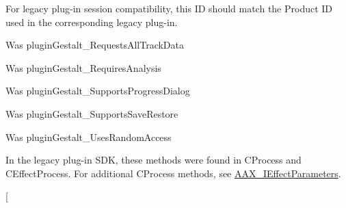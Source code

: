 \begin{DoxyRefList}
\item[\label{a00385__porting_notes000042}%
\hypertarget{a00385__porting_notes000042}{}%
global\+Scope$>$ Member \hyperlink{a00283_a6571f4e41a5dd06e4067249228e2249ea3a41fcdff5af1a4fd19dcbca7b1ba6f3}{A\+A\+X\+\_\+e\+Property\+\_\+\+Product\+I\+D} ]For legacy plug-\/in session compatibility, this I\+D should match the Product I\+D used in the corresponding legacy plug-\/in.  
\item[\label{a00385__porting_notes000052}%
\hypertarget{a00385__porting_notes000052}{}%
global\+Scope$>$ Member \hyperlink{a00283_a6571f4e41a5dd06e4067249228e2249eaa59caaf3d7c3e195a32b8cb09a9baac2}{A\+A\+X\+\_\+e\+Property\+\_\+\+Requests\+All\+Track\+Data} ]Was plugin\+Gestalt\+\_\+\+Requests\+All\+Track\+Data  
\item[\label{a00385__porting_notes000048}%
\hypertarget{a00385__porting_notes000048}{}%
global\+Scope$>$ Member \hyperlink{a00283_a6571f4e41a5dd06e4067249228e2249ea925c49bb79454b33bf1d5f4cb09d373f}{A\+A\+X\+\_\+e\+Property\+\_\+\+Requires\+Analysis} ]Was plugin\+Gestalt\+\_\+\+Requires\+Analysis  
\item[\label{a00385__porting_notes000056}%
\hypertarget{a00385__porting_notes000056}{}%
global\+Scope$>$ Member \hyperlink{a00283_a6571f4e41a5dd06e4067249228e2249eab9a9782ae1aed57b2f2cd6acd1081b38}{A\+A\+X\+\_\+e\+Property\+\_\+\+Supports\+Progress\+Dialog} ]Was plugin\+Gestalt\+\_\+\+Supports\+Progress\+Dialog  
\item[\label{a00385__porting_notes000059}%
\hypertarget{a00385__porting_notes000059}{}%
global\+Scope$>$ Member \hyperlink{a00283_a6571f4e41a5dd06e4067249228e2249ea6d42a3a901f36b74e7b9b8a84d4d5298}{A\+A\+X\+\_\+e\+Property\+\_\+\+Supports\+Save\+Restore} ]Was plugin\+Gestalt\+\_\+\+Supports\+Save\+Restore  
\item[\label{a00385__porting_notes000047}%
\hypertarget{a00385__porting_notes000047}{}%
global\+Scope$>$ Member \hyperlink{a00283_a6571f4e41a5dd06e4067249228e2249eab0bbaabe0a03b37e5a69f04a6f306076}{A\+A\+X\+\_\+e\+Property\+\_\+\+Uses\+Random\+Access} ]Was plugin\+Gestalt\+\_\+\+Uses\+Random\+Access  
\item[\label{a00385__porting_notes000030}%
\hypertarget{a00385__porting_notes000030}{}%
Class \hyperlink{a00060}{A\+A\+X\+\_\+\+I\+A\+C\+F\+Effect\+G\+U\+I} ]In the legacy plug-\/in S\+D\+K, these methods were found in C\+Process and C\+Effect\+Process. For additional C\+Process methods, see \hyperlink{a00099}{A\+A\+X\+\_\+\+I\+Effect\+Parameters}. 
\item[\label{a00385__porting_notes000031}%

\end{DoxyRefList}
